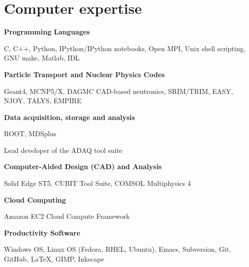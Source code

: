 \documentclass[10pt]{article}
\begin{document}
\section{Computer expertise}

\textbf{Programming Languages}
\begin{innerlist}
  \item C, C$+$$+$, Python, IPython/IPython notebooks, Open MPI, Unix shell scripting, GNU make, Matlab, IDL
\end{innerlist}

\halfblankline

\textbf{Particle Transport and Nuclear Physics Codes}
\begin{innerlist}
  \item Geant4, MCNP5/X, DAGMC CAD-based neutronics, SRIM/TRIM, EASY, NJOY, TALYS, EMPIRE
\end{innerlist}

\halfblankline

\textbf{Data acquisition, storage and analysis}
\begin{innerlist}
  \item ROOT, MDSplus
  \item Lead developer of the ADAQ tool suite
\end{innerlist}

\halfblankline

\textbf{Computer-Aided Design (CAD) and Analysis}
\begin{innerlist}
  \item Solid Edge ST5, CUBIT Tool Suite, COMSOL Multiphysics 4
\end{innerlist}

\halfblankline

\textbf{Cloud Computing}
\begin{innerlist}
  \item Amazon EC2 Cloud Compute Framework
\end{innerlist}

\halfblankline

\textbf{Productivity Software}
\begin{innerlist}
  \item Windows OS, Linux OS (Fedora, RHEL, Ubuntu), Emacs,
    Subversion, Git, GitHub, \LaTeX, GIMP, Inkscape
\end{innerlist} 




\end{document}

